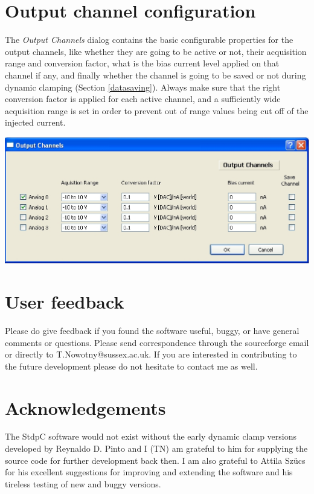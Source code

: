 \documentclass{article}
\begin{document}
\section{Output channel configuration} \label{outchnconfig}

The \emph{Output Channels} dialog contains the basic configurable properties
for the output channels, like whether they are going to be active or not,
their acquisition range and conversion factor, what is the bias current
level applied on that channel if any, and finally whether the channel is
going to be saved or not during dynamic clamping (Section
\ref{datasaving}). Always make sure that the right conversion factor is
applied for each active channel, and a sufficiently wide acquisition range
is set in order to prevent out of range values being cut off of the
injected current.

\includegraphics[scale=0.6]{outputChnDialog}


\section{User feedback} 
Please do give feedback if you found the software useful, buggy, or
have general comments or questions. Please send correspondence through
the sourceforge email or directly to T.Nowotny@sussex.ac.uk.
If you are interested in contributing to the future development please
do not hesitate to contact me as well.  
 
\section{Acknowledgements} 
 
The StdpC software would not exist without the early dynamic clamp
versions developed by Reynaldo D. Pinto and I (TN) am grateful to him for supplying the source code for further
development back then. I am also grateful to Attila Sz\"ucs for his excellent
suggestions for improving and extending the software and his tireless
testing of new and buggy versions.



\end{document}
